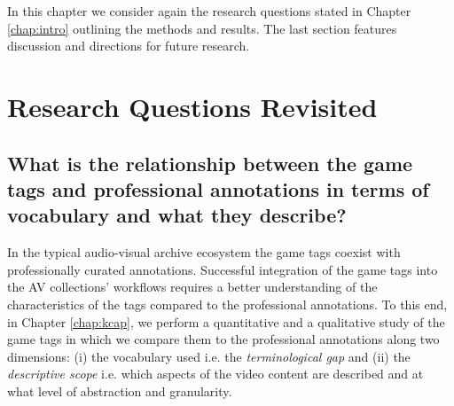 In this chapter we consider again the research questions stated in Chapter \ref{chap:intro} outlining the methods and results. The last section features discussion and directions for future research.

\section{Research Questions Revisited}
\subsection{What is the relationship between the game tags and professional annotations in terms of vocabulary and what they describe?}
In the typical audio-visual archive ecosystem the game tags coexist with professionally curated annotations.
Successful integration of the game tags into the AV collections' workflows requires a better understanding of the characteristics of the tags compared to the professional annotations. To this end, in Chapter \ref{chap:kcap}, we perform a quantitative and a qualitative study of the game tags in which we compare them to the professional annotations along two dimensions: (i) the vocabulary used i.e. the \textit{terminological gap} and (ii) the \textit{descriptive scope} i.e. which aspects of the video content are described and at what level of abstraction and granularity.


